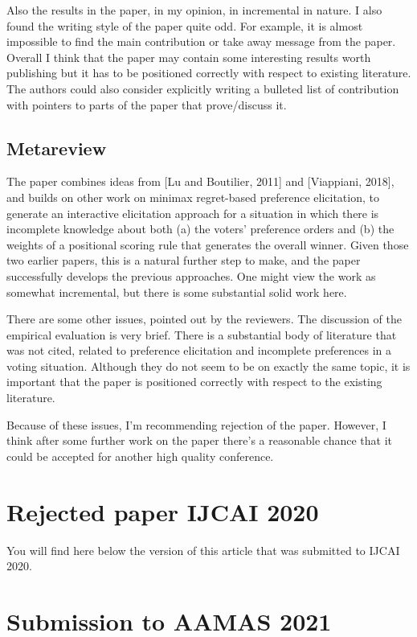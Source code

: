 \documentclass[version=3.21, pagesize, twoside=off, bibliography=totoc, DIV=calc, fontsize=12pt, a4paper]{scrartcl}
\begin{document}
Also the results in the paper, in my opinion, in incremental in nature. I also found the writing style of the paper quite odd. For example, it is almost impossible to find the main contribution or take away message from the paper. Overall I think that the paper may contain some interesting results worth publishing but it has to be positioned correctly with respect to existing literature. The authors could also consider explicitly writing a bulleted list of contribution with pointers to parts of the paper that prove/discuss it.

\subsection{Metareview}
The paper combines ideas from [Lu and Boutilier, 2011] and [Viappiani, 2018], and builds on other work on minimax regret-based preference elicitation, to generate an interactive elicitation approach for a situation in which there is incomplete knowledge about both (a) the voters' preference orders and (b) the weights of a positional scoring rule that generates the overall winner. Given those two earlier papers, this is a natural further step to make, and the paper successfully develops the previous approaches. One might view the work as somewhat incremental, but there is some substantial solid work here.

There are some other issues, pointed out by the reviewers. The discussion of the empirical evaluation is very brief. There is a substantial body of literature that was not cited, related to preference elicitation and incomplete preferences in a voting situation. Although they do not seem to be on exactly the same topic, it is important that the paper is positioned correctly with respect to the existing literature.

Because of these issues, I'm recommending rejection of the paper. However, I think after some further work on the paper there's a reasonable chance that it could be accepted for another high quality conference.

\section{Rejected paper IJCAI 2020}
You will find here below the version of this article that was submitted to IJCAI 2020.


\section{Submission to AAMAS 2021} 
\label{sec:reviews-aamas}
\end{document}
